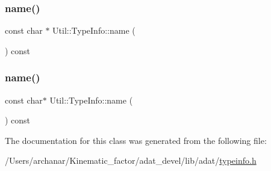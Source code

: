 \mbox{\label{classUtil_1_1TypeInfo_a0b8817efd5836d63f3d2ac808858dadb}} 
\subsubsection{\texorpdfstring{name()}{name()}\hspace{0.1cm}{\footnotesize\ttfamily [1/2]}}
{\footnotesize\ttfamily const char $\ast$ Util\+::\+Type\+Info\+::name (\begin{DoxyParamCaption}{ }\end{DoxyParamCaption}) const\hspace{0.3cm}{\ttfamily [inline]}}

\mbox{\label{classUtil_1_1TypeInfo_ae6ca4a05f56329034b44fff495170737}} 
\subsubsection{\texorpdfstring{name()}{name()}\hspace{0.1cm}{\footnotesize\ttfamily [2/2]}}
{\footnotesize\ttfamily const char$\ast$ Util\+::\+Type\+Info\+::name (\begin{DoxyParamCaption}{ }\end{DoxyParamCaption}) const}



The documentation for this class was generated from the following file\+:\begin{DoxyCompactItemize}
\item 
/\+Users/archanar/\+Kinematic\+\_\+factor/adat\+\_\+devel/lib/adat/\mbox{\hyperlink{lib_2adat_2typeinfo_8h}{typeinfo.\+h}}\end{DoxyCompactItemize}
